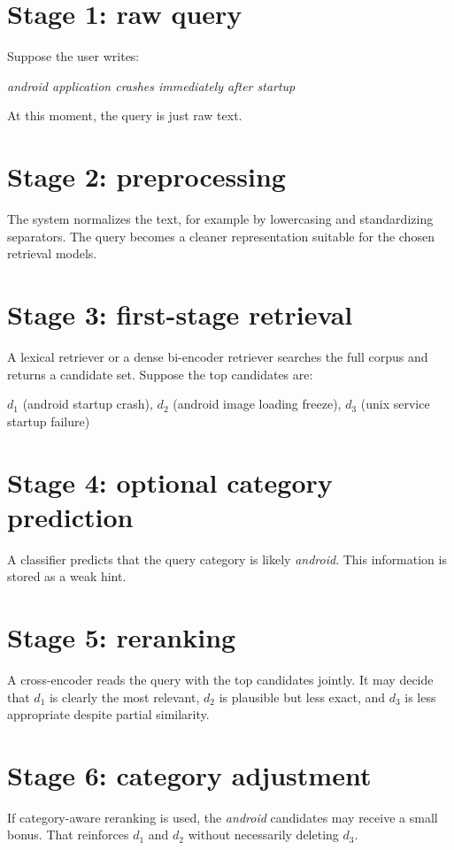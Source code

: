 \documentclass[11pt,oneside]{report}
\begin{document}
\section*{Stage 1: raw query}
Suppose the user writes:
\begin{center}
\emph{android application crashes immediately after startup}
\end{center}
At this moment, the query is just raw text.

\section*{Stage 2: preprocessing}
The system normalizes the text, for example by lowercasing and standardizing separators. The query becomes a cleaner representation suitable for the chosen retrieval models.

\section*{Stage 3: first-stage retrieval}
A lexical retriever or a dense bi-encoder retriever searches the full corpus and returns a candidate set. Suppose the top candidates are:
\begin{center}
$d_1$ (android startup crash), $d_2$ (android image loading freeze), $d_3$ (unix service startup failure)
\end{center}

\section*{Stage 4: optional category prediction}
A classifier predicts that the query category is likely \emph{android}. This information is stored as a weak hint.

\section*{Stage 5: reranking}
A cross-encoder reads the query with the top candidates jointly. It may decide that $d_1$ is clearly the most relevant, $d_2$ is plausible but less exact, and $d_3$ is less appropriate despite partial similarity.

\section*{Stage 6: category adjustment}
If category-aware reranking is used, the \emph{android} candidates may receive a small bonus. That reinforces $d_1$ and $d_2$ without necessarily deleting $d_3$.
\end{document}
